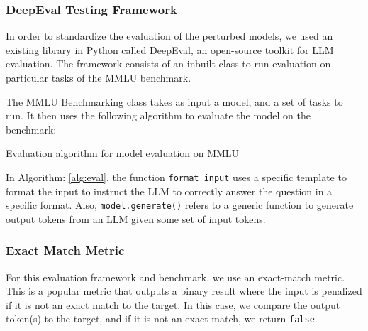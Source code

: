 \subsubsection{DeepEval Testing Framework}
In order to standardize the evaluation of the perturbed models, we used an existing library in Python called DeepEval, an open-source toolkit for LLM evaluation. The framework consists of an inbuilt class to run evaluation on particular tasks of the MMLU benchmark. 

The MMLU Benchmarking class takes as input a model, and a set of tasks to run. It then uses the following algorithm to evaluate the model on the benchmark:

\begin{algorithm}
    \caption{Evaluation algorithm for model evaluation on MMLU}
    \label{alg:eval}
    \SetAlgoLined
\end{algorithm}
In Algorithm: \ref{alg:eval}, the function \verb|format_input| uses a specific template to format the input to instruct the LLM to correctly answer the question in a specific format. Also, \verb|model.generate()| refers to a generic function to generate output tokens from an LLM given some set of input tokens. 

\subsubsection{Exact Match Metric}
For this evaluation framework and benchmark, we use an exact-match metric. This is a popular metric that outputs a binary result where the input is penalized if it is not an exact match to the target. In this case, we compare the output token(s) to the target, and if it is not an exact match, we return \verb|false|.

\pagebreak 

